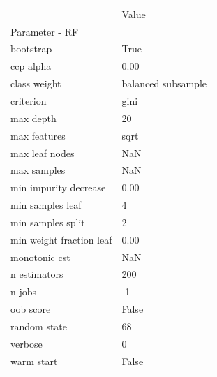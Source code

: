 \begin{tabular}{ll}
\toprule
 & Value \\
Parameter - RF &  \\
\midrule
bootstrap & True \\
ccp alpha & 0.00 \\
class weight & balanced subsample \\
criterion & gini \\
max depth & 20 \\
max features & sqrt \\
max leaf nodes & NaN \\
max samples & NaN \\
min impurity decrease & 0.00 \\
min samples leaf & 4 \\
min samples split & 2 \\
min weight fraction leaf & 0.00 \\
monotonic cst & NaN \\
n estimators & 200 \\
n jobs & -1 \\
oob score & False \\
random state & 68 \\
verbose & 0 \\
warm start & False \\
\bottomrule
\end{tabular}
